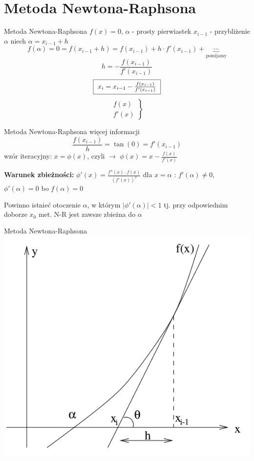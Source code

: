 \section{Metoda Newtona-Raphsona}
\begin{frame}{Metoda Newtona-Raphsona}
	$f(x) = 0$, $\alpha$ - prosty pierwiastek\linebreak
	$x_{i-1}$ - przybliżenie $\alpha$\linebreak
	niech $\alpha = x_{i-1} + h$
	\[
		f(\alpha) = 0 = f(x_{i-1} + h) = f(x_{i-1}) + h \cdot f'(x_{i-1}) + \underbrace{\cdots}_{\text{pomijamy}}
	\]
	\[
		h = - \frac{f(x_{i-1})}{f'(x_{i-1})}
	\]
	\[
		\fbox{ $x_{i} = x_{i-1} - \frac{f(x_{i-1})}{f'(x_{i-1})}$ }
	\]
	\[
		\left. \begin{array}{ll}
			f(x)\\
			f'(x)
		\end{array}\right\}
	\]
\end{frame}
\begin{frame}{Metoda Newtona-Raphsona}
	więcej informacji
	\[
		\frac{f(x_{i-1})}{h} = \tan(0) = f'(x_{i-1})
	\]
	wzór iteracyjny:
	$x = \phi(x)$, czyli $\rightarrow$ $\phi(x) = x - \frac{f(x)}{f'(x)}$\linebreak
	
	\textbf{Warunek zbieżności: } $\phi'(x) = \frac{f''(x) \cdot f(x)}{(f'(x))^{2}}$ dla $x = \alpha$ : $f'(\alpha) \neq 0$, $\phi'(\alpha) = 0$ bo $f(\alpha) = 0$\linebreak
	
	Powinno istnieć otoczenie $\alpha$, w którym $\lvert \phi'(\alpha) \rvert < 1$ tj. przy odpowiednim doborze $x_{0}$ met. N-R jest zawsze zbieżna do $\alpha$
\end{frame}
\begin{frame}{Metoda Newtona-Raphsona}
	\centering
	\includegraphics[width=.7\linewidth]{img/7/7_4_1}
\end{frame}
